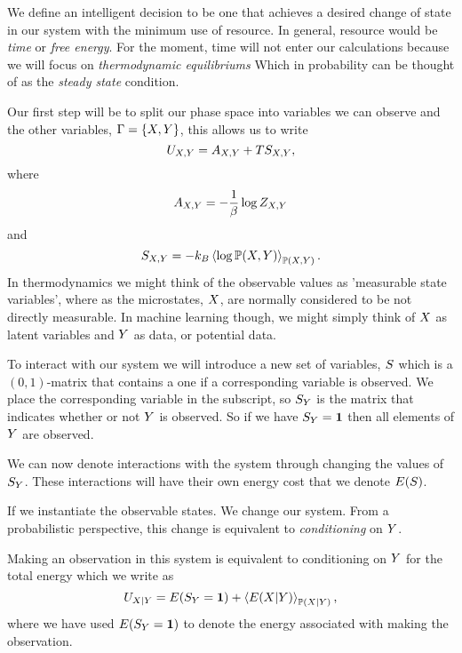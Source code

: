 \documentclass[]{article}
\begin{document}
We define an intelligent decision to be one that achieves a desired
change of state in our system with the minimum use of resource. In
general, resource would be \emph{time} or \emph{free energy}. For the
moment, time will not enter our calculations because we will focus on
\emph{thermodynamic equilibriums} Which in probability can be thought
of as the \emph{steady state} condition.

Our first step will be to split our phase space into variables we can
observe and the other variables,
\(\Gamma = \{X, Y\}\), this allows
us to write 
\[
U_{X,Y} = A_{X,Y} + TS_{X,Y},
\] 
where 
\[
A_{X,Y} = - \frac{1}{\beta}\log Z_{X,Y}
\] 
and 
\[
S_{X,Y} = -k_B \left\langle \log \mathbb{P}({X,Y}) \right\rangle_{\mathbb{P}({X,Y})}.
\]
In thermodynamics we might think of the observable values as 'measurable state variables', where as the microstates, $X$, are normally considered to be not directly measurable. In machine learning though, we might simply think of $X$ as latent variables and $Y$ as data, or potential data.

To interact with our system we will introduce a new set of variables, $S$ which is a $(0,1)$-matrix that contains a one if a corresponding variable is observed. We place the corresponding variable in the subscript, so $S_Y$ is the matrix that indicates whether or not $Y$ is observed. So if we have $S_Y = \mathbf{1}$ then all elements of $Y$ are observed. 

We can now denote interactions with the system through changing the values of $S_Y$. These interactions will have their own energy cost that we denote $E(S)$.

If we instantiate the observable states. We change our system. From a
probabilistic perspective, this change is equivalent to
\emph{conditioning} on \(Y\).

Making an observation in this system is equivalent to conditioning on
\(Y\) for the total energy which we write as 
\[
U_{X|Y} = E(S_Y=\mathbf{1}) +  \left\langle E({X|Y}) \right\rangle_{\mathbb{P}({X|Y})},
\]
where we have used $E(S_Y=\mathbf{1})$ to denote the energy associated with making the observation.
\end{document}
